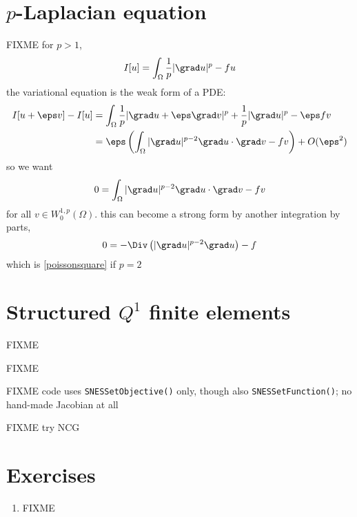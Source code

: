 
\section{$p$-Laplacian equation}

FIXME for $p>1$,
    $$I[u] = \int_\Omega \frac{1}{p} |\grad u|^p - fu$$
the variational equation is the weak form of a PDE:
\begin{align*}
I[u+\eps v] - I[u] &= \int_\Omega \frac{1}{p} |\grad u + \eps \grad v|^p + \frac{1}{p} |\grad u|^p - \eps f v \\
   &= \eps \left(\int_\Omega |\grad u|^{p-2} \grad u \cdot \grad v - f v\right) + O(\eps^2)
\end{align*}
so we want
    $$0 = \int_\Omega |\grad u|^{p-2} \grad u \cdot \grad v - f v$$
for all $v \in W^{1,p}_0(\Omega)$.  this can become a strong form by another integration by parts,
    $$0 = - \Div\left(|\grad u|^{p-2} \grad u\right) - f$$
which is \eqref{poissonsquare} if $p=2$

\section{Structured $Q^1$ finite elements}

FIXME

\begin{marginfigure}

\caption{FIXME}
\label{fig:q1hat}
\end{marginfigure}

FIXME code uses \texttt{SNESSetObjective()} only, though also \texttt{SNESSetFunction()}; no hand-made Jacobian at all

FIXME try NCG


\section{Exercises}

\renewcommand{\labelenumi}{\arabic{chapter}.\arabic{enumi}\quad}
\renewcommand{\labelenumii}{(\alph{enumii})}
\begin{enumerate}
\item FIXME
\end{enumerate}